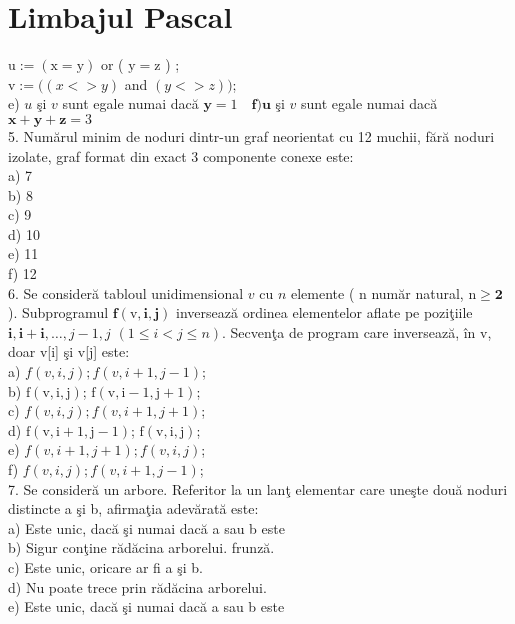 \section*{Limbajul Pascal}
$\mathrm{u}:=(\mathrm{x}=\mathrm{y})$ or ( $\mathrm{y}=\mathrm{z}$ ) ;\\
$\mathrm{v}:=((x<>y)$ and $(y<>z))$;\\
e) $u$ şi $v$ sunt egale numai dacă $\mathbf{y}=1 \quad \mathbf{f}) \mathbf{u}$ şi $v$ sunt egale numai dacă $\mathbf{x}+\mathbf{y}+\mathbf{z}=3$\\
5. Numărul minim de noduri dintr-un graf neorientat cu 12 muchii, fără noduri izolate, graf format din exact 3 componente conexe este:\\
a) 7\\
b) 8\\
c) 9\\
d) 10\\
e) 11\\
f) 12\\
6. Se consideră tabloul unidimensional $v$ cu $n$ elemente ( n număr natural, $\mathrm{n} \geq \mathbf{2}$ ). Subprogramul $\mathbf{f}(\mathrm{v}, \mathbf{i}, \mathbf{j})$ inversează ordinea elementelor aflate pe poziţiile $\mathbf{i}, \mathbf{i + i}, \ldots, j-1, j$ $(1 \leq i<j \leq n)$. Secvenţa de program care inversează, în v, doar v[i] şi v[j] este:\\
a) $f(v, i, j) ; f(v, i+1, j-1)$;\\
b) $\mathrm{f}(\mathrm{v}, \mathrm{i}, \mathrm{j})$; $\mathrm{f}(\mathrm{v}, \mathrm{i}-1, \mathrm{j}+1)$;\\
c) $f(v, i, j) ; f(v, i+1, j+1)$;\\
d) $\mathrm{f}(\mathrm{v}, \mathrm{i}+1, \mathrm{j}-1)$; $\mathrm{f}(\mathrm{v}, \mathrm{i}, \mathrm{j})$;\\
e) $f(v, i+1, j+1) ; f(v, i, j)$;\\
f) $f(v, i, j) ; f(v, i+1, j-1)$;\\
7. Se consideră un arbore. Referitor la un lanţ elementar care uneşte două noduri distincte a şi b, afirmaţia adevărată este:\\
a) Este unic, dacă şi numai dacă a sau b este\\
b) Sigur conţine rădăcina arborelui. frunză.\\
c) Este unic, oricare ar fi a şi b.\\
d) Nu poate trece prin rădăcina arborelui.\\
e) Este unic, dacă şi numai dacă a sau b este\\
